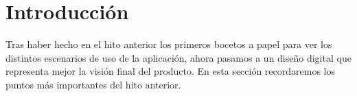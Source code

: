 \section{Introducción}

Tras haber hecho en el hito anterior los primeros bocetos a papel para ver los
distintos escenarios de uso de la aplicación, ahora pasamos a un diseño digital que
representa mejor la visión final del producto. En esta sección recordaremos los puntos
más importantes del hito anterior.